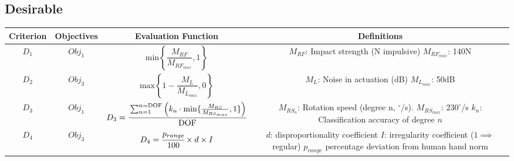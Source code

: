 \documentclass[11pt,3p]{report}
\begin{document}
	\subsection{Desirable} \label{des}
		\begin{center}
			\begin{tabular}{ |c|c|c|c| } 
 \hline
 Criterion & Objectives & Evaluation Function & Definitions \\ 
 \hline\hline
 $D_1$ & $Obj_1$ & $\text{min} \left \{\dfrac{M_{RF}}{M_{RF_{max}}},1 \right \}$ &  \makecell[l]{
  \vspace{1mm}
 $M_{RF}$: Impact strength (N impulsive) \\
 $M_{RF_{max}}$: 140N
 \vspace{1mm}
 } \\
 \hline
 
 $D_2$ & $Obj_3$ & $\text{max} \left \{1-\dfrac{M_L}{M_{L_{max}}}, 0 \right \}$ &  \makecell[l]{
 \vspace{2mm}
 $M_L$: Noise in actuation (dB) \\
 $M_{L_{max}}$: 50dB
 } \\
 \hline

 $D_3$ & $Obj_1$ & $D_3 =  \cfrac{\sum_{n=1}^{n=\text{DOF}} \left(k_n \cdot \text{min}\{\frac{M_{RS}}{M_{RS_{max}}},1\} \right)}{\text{DOF}}$ &  \makecell[l]{
 $M_{RS_n}$: Rotation speed (degree n, $^\circ$/s). \\
 $M_{RS_{max}}$: $230^\circ$/s \\
 $k_n$: Classification accuracy of degree $n$
 } \\
 \hline
 $D_4$ & $Obj_3$ & $D_4 = \cfrac{p_{range}}{100} \times d  \times I $ &  \makecell[l]{
 $d$: disproportionality coefficient \\
 $I$: irregularity coefficient ($1 \implies$ regular) \\
 $p_{range}$ percentage deviation from \\
 human hand norm
 } \\
 
 \hline
		\end{tabular}
	\end{center}



\pagebreak
\end{document}
